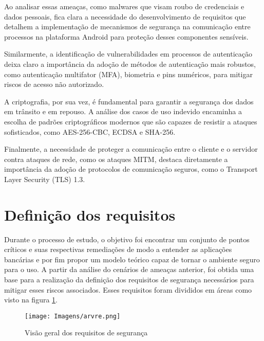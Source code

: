     Ao analisar essas ameaças, como malwares que visam roubo de credenciais e dados pessoais, fica clara a necessidade do desenvolvimento de requisitos que detalhem a implementação de mecanismos de segurança na comunicação entre processos na plataforma Android para proteção desses componentes sensíveis. 
    
    Similarmente, a identificação de vulnerabilidades em processos de autenticação deixa claro a importância da adoção de métodos de autenticação mais robustos, como autenticação multifator (MFA), biometria e pins numéricos, para mitigar riscos de acesso não autorizado.

    A criptografia, por sua vez, é fundamental para garantir a segurança dos dados em trânsito e em repouso. A análise dos casos de uso indevido encaminha a escolha de padrões criptográficos modernos que são capazes de resistir a ataques sofisticados, como AES-256-CBC, ECDSA e SHA-256. 
    
    Finalmente, a necessidade de proteger a comunicação entre o cliente e o servidor contra ataques de rede, como os ataques MITM, destaca diretamente a importância da adoção de protocolos de comunicação seguros, como o Transport Layer Security (TLS) 1.3.

    \section{Definição dos requisitos}
    Durante o processo de estudo, o objetivo foi encontrar um conjunto de pontos críticos e suas respectivas remediações de modo a entender as aplicações bancárias e por fim propor um modelo teórico capaz de tornar o ambiente seguro para o uso. A partir da análise do cenários de ameaças anterior, foi obtida uma base para a realização da definição dos requisitos de segurança necessários para mitigar esses riscos associados. Esses requisitos foram divididos em áreas como visto na figura \ref{visao}.

    \begin{figure}[H]
    \centering 
    \texttt{[image: Imagens/arvre.png]} 
    \caption{Visão geral dos requisitos de segurança}
    \label{visao}
    \end{figure}

